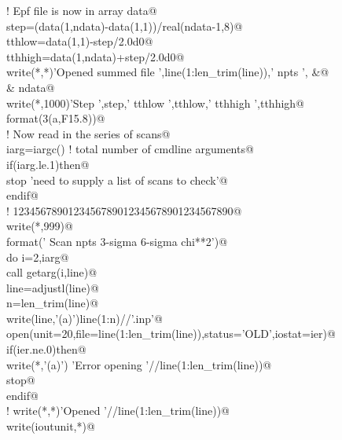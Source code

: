\documentclass[10pt,a4paper,notitlepage]{article}
\begin{document}
\begin{flushleft}
\begin{list}{}{}
\mbox{}\verb@! Epf file is now in array data@\\
\mbox{}\verb@      step=(data(1,ndata)-data(1,1))/real(ndata-1,8)@\\
\mbox{}\verb@      tthlow=data(1,1)-step/2.0d0@\\
\mbox{}\verb@      tthhigh=data(1,ndata)+step/2.0d0@\\
\mbox{}\verb@      write(*,*)'Opened summed file ',line(1:len_trim(line)),' npts ',    &@\\
\mbox{}\verb@     & ndata@\\
\mbox{}\verb@      write(*,1000)'Step ',step,' tthlow ',tthlow,' tthhigh ',tthhigh@\\
\mbox{} format(3(a,F15.8))@\\
\mbox{}\verb@! Now read in the series of scans@\\
\mbox{}\verb@      iarg=iargc() ! total number of cmdline arguments@\\
\mbox{}\verb@      if(iarg.le.1)then@\\
\mbox{}\verb@       stop 'need to supply a list of scans to check'@\\
\mbox{}\verb@      endif@\\
\mbox{}\verb@!                    1234567890123456789012345678901234567890@\\
\mbox{}\verb@      write(*,999)@\\
\mbox{}  format('      Scan      npts   3-sigma  6-sigma     chi**2')@\\
\mbox{}\verb@      do i=2,iarg@\\
\mbox{}\verb@       call getarg(i,line)@\\
\mbox{}\verb@       line=adjustl(line)@\\
\mbox{}\verb@       n=len_trim(line)@\\
\mbox{}\verb@       write(line,'(a)')line(1:n)//'.inp'@\\
\mbox{}\verb@       open(unit=20,file=line(1:len_trim(line)),status='OLD',iostat=ier)@\\
\mbox{}\verb@       if(ier.ne.0)then@\\
\mbox{}\verb@        write(*,'(a)') 'Error opening '//line(1:len_trim(line))@\\
\mbox{}\verb@        stop@\\
\mbox{}\verb@       endif@\\
\mbox{}\verb@!       write(*,*)'Opened '//line(1:len_trim(line))@\\
\mbox{}\verb@       write(ioutunit,*)@\\

\end{list}
\end{flushleft}
\end{document}
